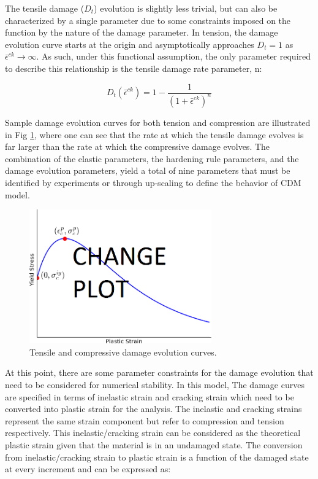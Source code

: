 The tensile damage ($D_{t}$) evolution is slightly less trivial, but can also be characterized by a single parameter due to some constraints imposed on the function by the nature of the damage parameter. In
tension, the damage evolution curve starts at the origin and asymptotically approaches $D_{t}=1$ as $\bar{\epsilon}^{ck}\rightarrow\infty$. As such, under this functional assumption, the only parameter required to describe this relationship is the tensile damage rate parameter, n:

\begin{equation}
D_{t}\left(\bar{\epsilon}^{ck}\right)=1-\frac{1}{\left(1+\bar{\epsilon}^{ck}\right)^{n}}\label{eqn:param4}
\end{equation}

Sample damage evolution curves for both tension and compression are illustrated in Fig \ref{fig:damageCurves}, where one can see that the rate at which the tensile damage evolves is far larger than the rate at which the compressive damage evolves. The combination of the elastic parameters, the hardening rule parameters, and the damage evolution parameters, yield a total of nine parameters that must be identified by experiments or through up-scaling to define the behavior of CDM model.

\begin{figure}[!htb]
\begin{center}
\includegraphics[width=0.7\textwidth]{figures/damageCurves/damageCurves}
\caption{{\label{fig:damageCurves} Tensile and compressive damage evolution curves.%
}}
\end{center}
\end{figure}

At this point, there are some parameter constraints for the damage evolution that need to be considered for numerical stability. In this model, The damage curves are specified in terms of inelastic strain and cracking strain which need to be converted into plastic strain for the analysis. The inelastic and cracking strains represent the same strain component but refer to compression and tension respectively. This inelastic/cracking strain can be considered as the theoretical plastic strain given that the material is in an undamaged state. The conversion from inelastic/cracking strain to plastic strain is a function of the damaged state at every increment and can be expressed as:

